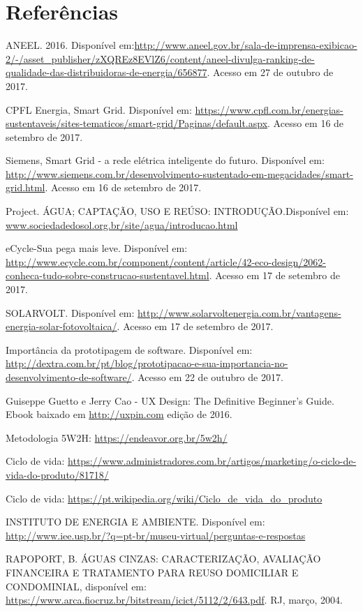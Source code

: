 \chapter*{Referências}
\par ANEEL. 2016. Disponível em:\url{http://www.aneel.gov.br/sala-de-imprensa-exibicao-2/-/asset_publisher/zXQREz8EVlZ6/content/aneel-divulga-ranking-de-qualidade-das-distribuidoras-de-energia/656877}. Acesso em 27 de outubro de 2017.
\par CPFL Energia, Smart Grid. Disponível em: \url{https://www.cpfl.com.br/energias-sustentaveis/sites-tematicos/smart-grid/Paginas/default.aspx}. Acesso em 16 de setembro de 2017.
\par Siemens, Smart Grid - a rede elétrica inteligente do futuro. Disponível em: \url{http://www.siemens.com.br/desenvolvimento-sustentado-em-megacidades/smart-grid.html}. Acesso em 16 de setembro de 2017.
\par Project. ÁGUA; CAPTAÇÃO, USO E REÚSO: INTRODUÇÃO.Disponível em: \url{www.sociedadedosol.org.br/site/agua/introducao.html}
\par eCycle-Sua pega mais leve. Disponível em: \url{http://www.ecycle.com.br/component/content/article/42-eco-design/2062-conheca-tudo-sobre-construcao-sustentavel.html}. Acesso em 17 de setembro de 2017.
\par SOLARVOLT. Disponível em: \url{http://www.solarvoltenergia.com.br/vantagens-energia-solar-fotovoltaica/}. Acesso em 17 de setembro de 2017.
\par Importância da prototipagem de software. Disponível em: \url{http://dextra.com.br/pt/blog/prototipacao-e-sua-importancia-no-desenvolvimento-de-software/}. Acesso em 22 de outubro de 2017.
\par Guiseppe Guetto e Jerry Cao - UX Design: The Definitive Beginner’s Guide. Ebook baixado em \url{http://uxpin.com} edição de 2016.
\par Metodologia 5W2H: \url{https://endeavor.org.br/5w2h/}
\par Ciclo de vida: \url{https://www.administradores.com.br/artigos/marketing/o-ciclo-de-vida-do-produto/81718/}
\par Ciclo de vida: \url{https://pt.wikipedia.org/wiki/Ciclo_de_vida_do_produto}
\par INSTITUTO DE ENERGIA E AMBIENTE. Disponível em: \url{http://www.iee.usp.br/?q=pt-br/museu-virtual/perguntas-e-respostas}
\par RAPOPORT, B. ÁGUAS CINZAS: CARACTERIZAÇÃO, AVALIAÇÃO FINANCEIRA E TRATAMENTO PARA REUSO DOMICILIAR E CONDOMINIAL, disponível em: \url{https://www.arca.fiocruz.br/bitstream/icict/5112/2/643.pdf}. RJ, março, 2004.
